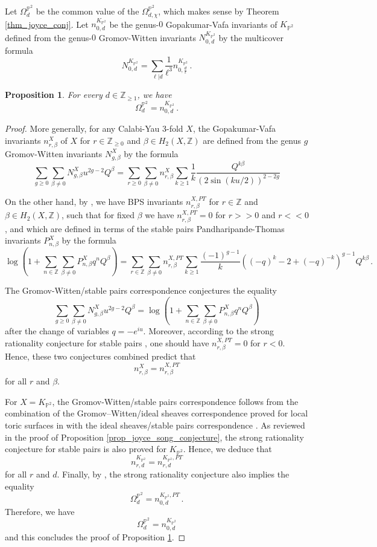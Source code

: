 \documentclass[11pt,letterpaper]{amsart}
\newtheorem{prop}[defn]{Proposition}
\newcommand\PP{\mathbb P}
\newcommand\Z{\mathbb Z}
\begin{document}
Let $\Omega_d^{\PP^2}$ be the common value of the 
$\Omega_{d,\chi}^{\PP^2}$, which makes sense by Theorem 
\ref{thm_joyce_conj}. Let $n_{0,d}^{K_{\PP^2}}$ be the genus-$0$ Gopakumar-Vafa invariants of $K_{\PP^2}$ defined from the genus-$0$ Gromov-Witten invariants 
$N_{0,d}^{K_{\PP^2}}$ by the multicover formula
\[
N_{0,d}^{K_{\PP^2}}=\sum_{\ell|d} \frac{1}{\ell^3}
n_{0,\frac{d}{\ell}}^{K_{\PP^2}}\,.
\]

\begin{prop} \label{prop_katz_conj}
For every $d \in \Z_{\geqslant 1}$, we have 
\[ \Omega_d^{\PP^2}=n_{0,d}^{K_{\PP^2}}\,.\]
\end{prop}

\begin{proof}
More generally, for any Calabi-Yau 3-fold $X$, the Gopakumar-Vafa invariants $n_{r,\beta}^X$ of $X$ for $r\in \Z_{\geq 0}$ and $\beta \in H_2(X,\Z)$ are defined from the genus $g$ Gromov-Witten invariants $N_{g,\beta}^X$ by the formula
\[ \sum_{g \geq 0} \sum_{\beta \neq 0} N_{g,\beta}^X u^{2g-2} Q^\beta = \sum_{r \geq 0} \sum_{\beta \neq 0} n_{r,\beta}^X 
\sum_{k \geq 1} \frac{1}{k} \frac{Q^{k \beta}}{\left( 2 \sin (ku/2) \right)^{2-2g}}\]

On the other hand, by \cite[\S 3]{MR2545686}, we have BPS invariants $n_{r,\beta}^{X,PT}$ for $r \in \Z$ and $\beta \in H_2(X,\Z)$, such that for fixed $\beta$ we have $n_{r,\beta}^{X,PT}=0$ for $r>>0$ and $r<<0$, and which are defined in terms of the stable pairs Pandharipande-Thomas invariants $P_{n,\beta}^X$ by the formula
\[ \log(1+\sum_{n \in \Z} \sum_{\beta \neq 0}P_{n,\beta}^X q^n Q^\beta)= \sum_{r \in \Z} \sum_{\beta \neq 0} n_{r,\beta}^{X,PT} \sum_{k \geq 1} \frac{(-1)^{g-1}}{k}((-q)^k-2+(-q)^{-k})^{g-1} Q^{k \beta} \,.\]

The Gromov-Witten/stable pairs correspondence conjectures the equality
\[ \sum_{g \geq 0} \sum_{\beta \neq 0} N_{g,\beta}^X u^{2g-2} Q^\beta = \log(1+\sum_{n \in \Z} \sum_{\beta \neq 0}P_{n,\beta}^X q^n Q^\beta) \]
after the change of variables $q=-e^{iu}$. Moreover, according to the strong rationality conjecture for stable pairs \cite[Conjecture 3.14]{MR2545686}, one should have $n_{r,\beta}^{X,PT}=0$ for $r<0$. Hence, these two conjectures combined predict that 
\[ n_{r,\beta}^{X}=n_{r,\beta}^{X,PT}\]
for all $r$ and $\beta$.

For $X=K_{\PP^2}$, the Gromov-Witten/stable pairs correspondence follows from the combination of the Gromov--Witten/ideal sheaves correspondence proved for local toric surfaces in \cite{MR2264664} with the ideal sheaves/stable pairs
correspondence \cite{MR2813335}\cite[\S 5]{MR2746343}.
As reviewed in the proof of Proposition \ref{prop_joyce_song_conjecture}, the strong rationality conjecture for stable pairs is also proved for $K_{\PP^2}$. Hence, we deduce that
\[ n_{r,d}^{K_{\PP^2}}= n_{r,d}^{K_{\PP^2},PT} \]
for all $r$ and $d$.
Finally, by
\cite[Theorem 6.4]{MR2892766}, the strong rationality conjecture also implies the equality
\[ \Omega_d^{\PP^2} = n_{0,d}^{K_{\PP^2},PT} \,.\]
Therefore, we have 
\[\Omega_d^{\PP^2} = n_{0,d}^{K_{\PP^2}} \] 
and this concludes the proof of Proposition \ref{prop_katz_conj}.
\end{proof}
\end{document}
